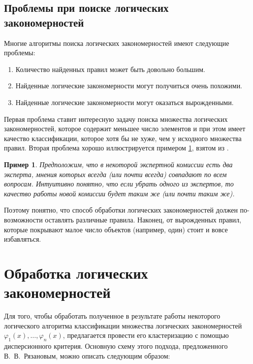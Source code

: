 \documentclass[12pt]{article}
\newtheorem{example}{Пример}
\begin{document}
\subsection{Проблемы при поиске логических закономерностей}

Многие алгоритмы поиска логических закономерностей имеют следующие
проблемы:

\begin{enumerate}
\item Количество найденных правил может быть довольно большим.
\item Найденные логические закономерности могут получиться очень
  похожими.
\item Найденные логические закономерности могут оказаться
  вырожденными.
\end{enumerate}

Первая проблема ставит интересную задачу поиска множества логических
закономерностей, которое содержит меньшее число элементов и при этом
имеет качество классификации, которое хотя бы не хуже, чем у исходного
множества правил. Вторая проблема хорошо иллюстрируется примером
\ref{ex:same:experts}, взятом из \cite{voron10logicalgs}.

\begin{example}\label{ex:same:experts}
  Предположим, что в некоторой экспертной комиссии есть два эксперта,
  мнения которых всегда (или почти всегда) совпадают по всем
  вопросам. Интуитивно понятно, что если убрать одного из экспертов,
  то качество работы новой комиссии будет таким же (или почти таким
  же).
\end{example}

Поэтому понятно, что способ обработки логических закономерностей
должен по-возможности оставлять различные правила. Наконец, от
вырожденных правил, которые покрывают малое число объектов (например,
один) стоит и вовсе избавляться.

\section{Обработка логических закономерностей}
\label{sec:processing}


Для того, чтобы обработать полученное в результате работы некоторого
логического алгоритма классификации множества логических
закономерностей \(\varphi_1(x), \dots, \varphi_n(x)\), предлагается
провести его кластеризацию с помощью дисперсионного критерия.
Основную схему этого подхода, предложенного В.~В.~Рязановым, можно
описать следующим образом:
\end{document}
